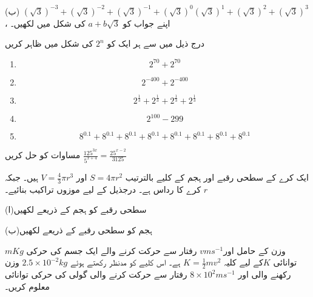 (ب) \((\sqrt{3})^{-3}+(\sqrt{3})^{-2}+(\sqrt{3})^{-1}+(\sqrt{3})^{0}(\sqrt{3})^{1}+(\sqrt{3})^{2}+(\sqrt{3})^{3}\)
، اپنے جواب کو \( a+b\sqrt{3}\)
 کی شکل میں لکھیں۔

درج ذیل میں سے ہر ایک کو \(2^{n}\) کی شکل میں ظاہر کریں

\begin{multicols}{2}
\begin{enumerate}[.a]
\item
\[2^{70}+2^{70}\]
\item
\[2^{-400}+2^{-400}\]
\item
\[2^{\frac{1}{3}}+2^{\frac{1}{3}}+2^{\frac{1}{3}}+2^{\frac{1}{3}}\]
\item
\[2^{100}-2{99}\]
\item
\[8^{0.1}+8^{0.1}+8^{0.1}+8^{0.1}+8^{0.1}+8^{0.1}+8^{0.1}+8^{0.1}\]
\end{enumerate}
\end{multicols}


مساوات کو حل کریں
\(\frac{125^{3x}}{5^{x+4}}=\frac{25^{x-2}}{3125}\)

ایک کرے کے سطحی رقبے اور ہجم کے کلیے بالترتیب
 \(S=4\pi r^{2}\) 
اور 
\(V=\frac{4}{3}\pi r^{3}\) 
ہیں۔ جبکہ
 \(r\) کرے کا رداس ہے۔ درجذیل کے لیے موزوں تراکیب بنائیے۔

(ا)سطحی رقبے کو ہجم کے ذریعے لکھیں

(ب)ہجم کو سطحی رقبے کے ذریعے لکھیں


\(mKg\) وزن کے حامل  اور\(vms^{-1}\) رفتار سے حرکت کرنے والے ایک جسم کی حرکی توانائی
 \(K\)کے لیے کلیہ \(K=\frac{1}{2}mv^{2}\) ہے۔
اس کلیے کو مدنظر رکھتے ہوئے
 \(2.5\times10^{-2}kg\) وزن رکھنے والی اور
 \(8\times10^{2}ms^{-1}\) رفتار سے حرکت کرنے والی گولی کی حرکی توانائی معلوم کریں۔



